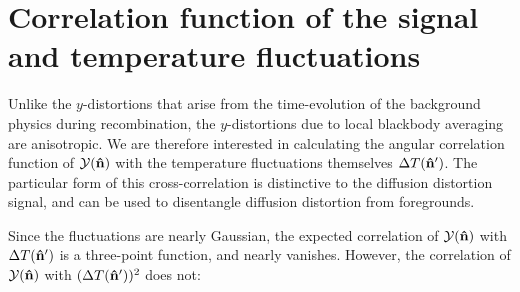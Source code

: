 \documentclass[fleqn,usenatbib]{mnras}
\begin{document}


\section{Correlation function of the signal and temperature fluctuations}
\label{sec:correlation_functions}

    Unlike the $y$-distortions that arise from the time-evolution of the
    background physics during recombination, the $y$-distortions due to local
    blackbody averaging are anisotropic.  We are therefore interested in
    calculating the angular correlation function of $\mathcal{Y}({\bf\hat{n}})$ with the
    temperature fluctuations themselves ${\Delta T}({\bf\hat{n}}')$.  The particular form
    of this cross-correlation is distinctive to the diffusion distortion signal,
    and can be used to disentangle diffusion distortion from foregrounds.

    Since the fluctuations are nearly Gaussian, the expected correlation of
    $\mathcal{Y}({\bf\hat{n}})$ with ${\Delta T}({\bf\hat{n}}')$ is a three-point function, and nearly
    vanishes.  However, the correlation of $\mathcal{Y}({\bf\hat{n}})$ with
    $({\Delta T}({\bf\hat{n}}'))^2$ does not:
\end{document}
